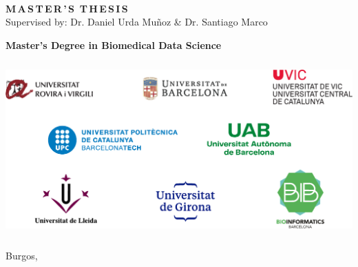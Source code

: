 \begin{center}
\begin{spacing}{1.1}
    \vspace{4mm}
\end{spacing}

\begin{center}
\begin{spacing}{1.3}
\textbf{\Large {\thesisAuthor}}\\
\end{spacing}
\end{center}
\vspace{2cm} 

\begin{spacing}{1.0}
\textbf{\LARGE {\thesisTitle}}
\end{spacing}

\vspace{15 mm}

\begin{spacing}{1.3}
\textbf{\LARGE {M\,A\,S\,T\,E\,R\,'\,S\, T\,H\,E\,S\,I\,S}}\\
\medskip
{\large {Supervised by: Dr. Daniel Urda Muñoz \&  Dr. Santiago Marco}}
\end{spacing}
\end{center}
\vspace{1cm} 

\begin{center}
\textbf{\large {Master's Degree in Biomedical Data Science}}
\end{center}
\vspace{1cm} 


\begin{center}
\includegraphics[width=15cm, height=6.7cm]{figures/logos_new.pdf}
\end{center}
\vspace{1cm} 
\begin{center}
   \large {Burgos, \thesisDate}
\end{center}